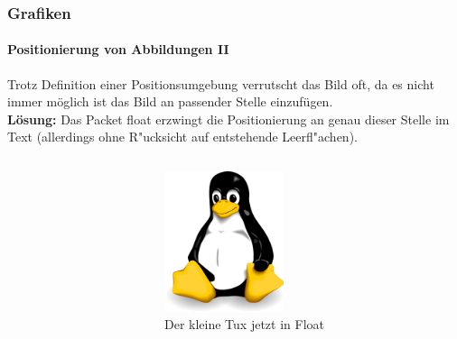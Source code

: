 
\begin{frame}[t]
\medskip
\frametitle{Grafiken}
\framesubtitle{Positionierung von Abbildungen II }
Trotz Definition einer Positionsumgebung verrutscht das Bild oft, da es nicht immer m\"oglich ist das Bild an passender Stelle einzufügen.\\
\textbf{L\"osung:} Das Packet {\ttfamily float} erzwingt die Positionierung an genau dieser Stelle im Text (allerdings ohne R"ucksicht auf entstehende Leerfl"achen).

\begin{columns}
\begin{column}{.5\textwidth}
{\ttfamily {\footnotesize
}}
\end{column}

\begin{column}{.5\textwidth} 
\begin{figure}
\begin{center}
    \includegraphics[width=35mm]{image/tux.png}
\caption{Der kleine Tux jetzt in Float}
\label{img:kleinertux_float}
\end{center}
\end{figure}
\end{column}
\end{columns}

\end{frame}
